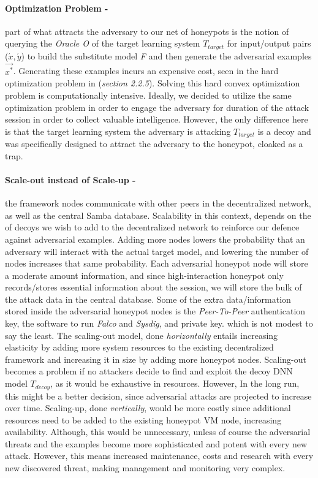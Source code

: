 \documentclass[grad,lot,lof,11pt,oneside,onehalfspace]{RUthesis}
\begin{document}
\paragraph{Optimization Problem -} part of what attracts  the adversary to our net of honeypots is the notion of querying the \textit{Oracle O} of the target learning system \textit{$T_{target}$} for input/output pairs ($\acute{x},\acute{y}$) to build the substitute model \textit{F} and then generate the adversarial examples $\vec{x^{*}}$. Generating these examples incurs an expensive cost, seen in the hard optimization problem in (\textit{section 2.2.5}). Solving this hard convex optimization problem is computationally intensive.  Ideally, we decided to utilize the same optimization problem in order to engage the adversary for duration of the attack session in order to collect valuable intelligence. However, the only difference here is that the target learning system the adversary is attacking \textit{$T_{target}$} is a decoy and was specifically designed to attract the adversary to the honeypot, cloaked as a trap. 
\paragraph{Scale-out instead of Scale-up -} the framework nodes communicate with other peers in the decentralized network, as well as the central Samba database. Scalability in this context, depends on the of decoys we wish to add to the decentralized network to reinforce our defence against adversarial examples. Adding more nodes lowers the probability that an adversary will interact with the actual target model, and lowering  the number of nodes increases that same  probability. Each adversarial honeypot node will store a moderate amount information, and since high-interaction honeypot only records/stores essential information about the session, we will store the bulk of the attack data in the central database. Some of the extra data/information stored inside the adversarial honeypot nodes is the \textit{Peer-To-Peer} authentication key, the software to run \textit{Falco} and \textit{Sysdig}, and private key. which is not modest to say the least. The scaling-out model, done \textit{horizontally} entails increasing elasticity by adding more system resources to the existing decentralized framework and increasing it in size by adding more honeypot nodes. Scaling-out becomes a problem if no attackers decide to find and exploit the decoy DNN model \textit{$T_{decoy}$}, as it would be exhaustive in  resources. However, In the long run, this might be a better decision, since adversarial attacks are projected to increase over time. Scaling-up, done \textit{vertically}, would be more costly since additional resources need to be added to the existing honeypot VM node, increasing availability. Although, this would be unnecessary, unless of course the adversarial  threats and the examples become more sophisticated and potent with every new attack. However, this means increased maintenance, costs and research with every new discovered threat, making management and monitoring very complex.  
  
\end{document}
